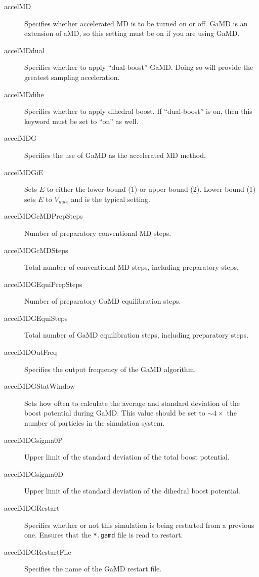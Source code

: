 \documentclass[9pt,tutorial]{livecoms}
\begin{document}
\begin{description}
    \item[accelMD] Specifies whether accelerated MD is to be turned on or off. GaMD is an extension of aMD, so this setting must be on if you are using GaMD.
    \item[accelMDdual] Specifies whether to apply ``dual-boost'' GaMD. Doing so will provide the greatest sampling acceleration.
    \item[accelMDdihe] Specifies whether to apply dihedral boost. If ``dual-boost'' is on, then this keyword must be set to ``on'' as well. 
    \item[accelMDG] Specifies the use of GaMD as the accelerated MD method.
    \item[accelMDGiE] Sets $E$ to either the lower bound (1) or upper bound (2). Lower bound (1) sets $E$ to $V_{max}$ and is the typical setting.
    \item[accelMDGcMDPrepSteps] Number of preparatory conventional MD steps.
    \item[accelMDGcMDSteps] Total number of conventional MD steps, including preparatory steps.
    \item[accelMDGEquiPrepSteps] Number of preparatory GaMD equilibration steps.
    \item[accelMDGEquiSteps] Total number of GaMD equilibration steps, including preparatory steps.
    \item[accelMDOutFreq] Specifies the output frequency of the GaMD algorithm.
    \item[accelMDGStatWindow]  Sets how often to calculate the average and standard deviation of the boost potential during GaMD. This value should be set to $\sim4\times$ the number of particles in the simulation system.
    \item[accelMDGsigma0P] Upper limit of the standard deviation of the total boost potential.
    \item[accelMDGsigma0D] Upper limit of the standard deviation of the dihedral boost potential.
    \item[accelMDGRestart] Specifies whether or not this simulation is being restarted from a previous one. Ensures that the \texttt{*.gamd} file is read to restart. 
    \item[accelMDGRestartFile] Specifies the name of the GaMD restart file.
\end{description}

\bigskip
\end{document}
